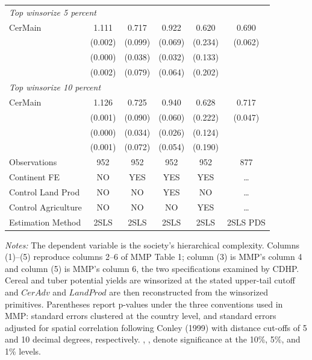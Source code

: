 \documentclass[11pt]{article}
\begin{document}
\begin{table}[htbp]
\begin{tabular}{l*{5}{c}}
\hline
\multicolumn{6}{l}{\textit{Top winsorize 5 percent}}\\
CerMain  &    1.111  &    0.717  &    0.922  &    0.620  &    0.690  \\
         &  (0.002)\sym{***}&  (0.099)\sym{*}  &  (0.069)\sym{*}  &  (0.234)  &  (0.062)\sym{*}  \\
         &  (0.000)\sym{***} & (0.038)\sym{**} & (0.032)\sym{**} & (0.133) & \\
         &  (0.002)\sym{***} & (0.079)\sym{*} & (0.064)\sym{*} & (0.202) & \\
\hline
\multicolumn{6}{l}{\textit{Top winsorize 10 percent}}\\
CerMain  &    1.126  &    0.725  &    0.940  &    0.628  &    0.717  \\
         &  (0.001)\sym{***}&  (0.090)\sym{*}  &  (0.060)\sym{*}  &  (0.222)  &  (0.047)\sym{**} \\
         &  (0.000)\sym{***} & (0.034)\sym{**} & (0.026)\sym{**} & (0.124) & \\
         &  (0.001)\sym{***} & (0.072)\sym{*} & (0.054)\sym{*} & (0.190) & \\
\hline
Observations       &  952 &  952 &  952 &  952 &  877 \\
Continent FE       &   NO & YES & YES & YES & \ldots \\
Control Land Prod  &   NO &  NO & YES &  NO & \ldots \\
Control Agriculture&   NO &  NO &  NO & YES & \ldots \\
Estimation Method  & 2SLS & 2SLS & 2SLS & 2SLS & 2SLS PDS \\
\hline\hline
\end{tabular}

\vspace{2pt}
\begin{minipage}{0.98\textwidth}
\scriptsize \textit{Notes:} The dependent variable is the society's hierarchical
complexity. Columns (1)--(5) reproduce columns 2--6 of MMP Table 1; column (3) is MMP's
column 4 and column (5) is MMP's column 6, the two specifications examined by CDHP. Cereal
and tuber potential yields are winsorized at the stated upper-tail cutoff and $CerAdv$ and
$LandProd$ are then reconstructed from the winsorized primitives.
Parentheses report p-values under the three conventions used in MMP: standard errors
clustered at the country level, and standard errors adjusted for spatial correlation
following Conley (1999) with distance cut-offs of 5 and 10 decimal degrees, respectively.
\sym{*}, \sym{**}, \sym{***} denote significance at the 10\%, 5\%, and 1\%
levels. 
\end{minipage}
\end{table}
\end{document}
